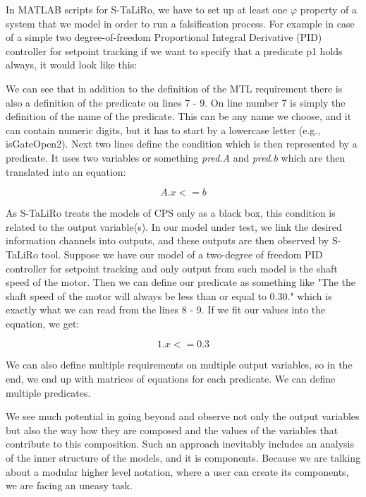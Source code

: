 In MATLAB scripts for S-TaLiRo, we have to set up at least one $\varphi$ property of a system that we model in order to run a falsification process. For example in case of a simple two degree-of-freedom Proportional Integral Derivative (PID) controller for setpoint tracking if we want to specify that a predicate p1 holds always, it would look like this:




We can see that in addition to the definition of the MTL requirement there is also a definition of the predicate on lines 7 - 9. On line number 7 is simply the definition of the name of the predicate. This can be any name we choose, and it can contain numeric digits, but it has to start by a lowercase letter (e.g., isGateOpen2). Next two lines define the condition which is then represented by a predicate. It uses two variables or something \textit{pred.A} and \textit{pred.b} which are then translated into an equation:

\begin{equation}
A.x <= b
\end{equation}

As S-TaLiRo treats the models of CPS only as a black box, this condition is related to the output variable(s). In our model under test, we link the desired information channels into outputs, and these outputs are then observed by S-TaLiRo tool. Suppose we have our model of a two-degree of freedom PID controller for setpoint tracking and only output from such model is the shaft speed of the motor. Then we can define our predicate as something like "The the shaft speed of the motor will always be less than or equal to 0.30." which is exactly what we can read from the lines 8 - 9. If we fit our values into the equation, we get:

\begin{equation}
1.x <= 0.3
\end{equation}

We can also define multiple requirements on multiple output variables, so in the end, we end up with matrices of equations for each predicate. We can define multiple predicates.

We see much potential in going beyond and observe not only the output variables but also the way how they are composed and the values of the variables that contribute to this composition. Such an approach inevitably includes an analysis of the inner structure of the models, and it is components. Because we are talking about a modular higher level notation, where a user can create its components, we are facing an uneasy task. 
